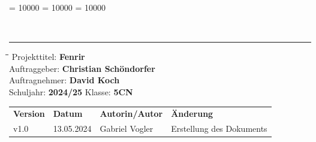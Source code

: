 \documentclass[
	headings=optiontotocandhead,%
	oneside,
	numbers=noenddot,%
	toc=flat, %
	10pt, %
	parskip=full, %
	listof=totoc, %
	listof=flat, %
	numbers=noenddot, %
	bibliography=totoc, %
	a4paper,DIV=14,
]{scrartcl}
\newcommand\Tstrut{\rule{0pt}{3.2ex}}         %
\newcommand\Bstrut{\rule[-1.5ex]{0pt}{0pt}}   %
\newenvironment{nstabbing}
	{\setlength{\topsep}{-\parskip}
		\setlength{\partopsep}{-\parskip}
		\tabbing}
	{\endtabbing}
\begin{document}
\clubpenalty = 10000 %
\widowpenalty = 10000 %
\displaywidowpenalty = 10000

{\sffamily{\textbf{\LARGE{\textcolor{orange}{Stakeholderanalyse}}}}}\\
\noindent\rule{\textwidth}{0.1pt}
\begin{nstabbing}
	\hspace{4cm}\=\hspace{4cm}\=\hspace{4cm}\=\kill
	Projekttitel: \> \textbf{Fenrir}\\
	Auftraggeber: \> \textbf{Christian Schöndorfer}\\
	Auftragnehmer: \> \textbf{David Koch}\\
	Schuljahr: \> \textbf{2024/25}
	\> Klasse: \> \textbf{5CN}\\
\end{nstabbing}
{\smaller
	\begin{tabularx}{\textwidth}{l l l l}
	\hline
	\textbf{Version} & \textbf{Datum} & \textbf{Autorin/Autor} & \textbf{Änderung}\Tstrut  \\
	v1.0 & 13.05.2024 & Gabriel Vogler & Erstellung des Dokuments  \Bstrut \\
	\hline
	\end{tabularx}
}
\end{document}
